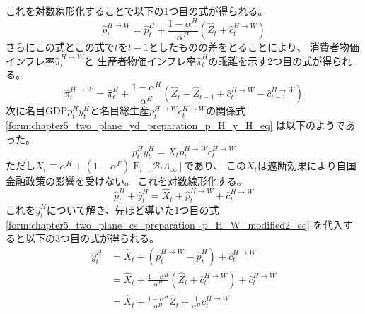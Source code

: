 これを対数線形化することで以下の1つ目の式が得られる。
\begin{equation}
\label{form:chapter5_two_plane_cs_preparation_p_H_W_modified2_eq}
    \hat{p}_t^{H\to W}=\hat{p}_t^H+\frac{1-\alpha^H}{\alpha^H}(\hat{Z}_t+\hat{c}_t^{H\to W})
\end{equation}
さらにこの式とこの式で\(t\)を\(t-1\)としたものの差をとることにより、
消費者物価インフレ率\(\hat{\pi}_t^{H\to W}\)と
生産者物価インフレ率\(\hat{\pi}_t^H\)の乖離を示す2つ目の式が得られる。
\begin{equation}
\label{form:chapter5_two_plane_cs_preparation_pi_H_W_eq}
    \hat{\pi}_t^{H\to W}=\hat{\pi}_t^H+\frac{1-\alpha^H}{\alpha^H}(\hat{Z}_t-\hat{Z}_{t-1}+\hat{c}_t^{H\to W}-\hat{c}_{t-1}^{H\to W})
\end{equation}
次に名目GDP\(p_t^Hy_t^H\)と名目総生産\(p_t^{H\to W}c_t^{H\to W}\)の関係式
\eqref{form:chapter5_two_plane_yd_preparation_p_H_y_H_eq}
は以下のようであった。
\begin{equation}
\label{form:chapter5_two_plane_cs_preparation_p_H_y_H_eq}
    p_t^Hy_t^H=X_tp_t^{H\to W}c_t^{H\to W}
\end{equation}
ただし\(X_t\equiv\alpha^H+(1-\alpha^F)\operatorname{E}_t[\mathcal{B}_t\Lambda_{\infty}]\)であり、
この\(X_t\)は遮断効果により自国金融政策の影響を受けない。
これを対数線形化する。
\begin{equation}
\label{form:chapter5_two_plane_cs_preparation_p_H_y_H_modified_eq}
    \hat{p}_t^H+\hat{y}_t^H=\hat{X}_t+\hat{p}_t^{H\to W}+\hat{c}_t^{H\to W}
\end{equation}
これを\(\hat{y}_t^H\)について解き、先ほど導いた1つ目の式
\eqref{form:chapter5_two_plane_cs_preparation_p_H_W_modified2_eq}
を代入すると以下の3つ目の式が得られる。
\begin{equation}
\label{form:chapter5_two_plane_cs_preparation_p_H_y_H_modified2_eq}
\begin{aligned}
    \hat{y}_t^H
    &=\hat{X}_t+(\hat{p}_t^{H\to W}-\hat{p}_t^H)+\hat{c}_t^{H\to W} \\
    &=\hat{X}_t+\frac{1-\alpha^H}{\alpha^H}(\hat{Z}_t+\hat{c}_t^{H\to W})+\hat{c}_t^{H\to W} \\
    &=\hat{X}_t+\frac{1-\alpha^H}{\alpha^H}\hat{Z}_t+\frac{1}{\alpha^H}\hat{c}_t^{H\to W}
\end{aligned}
\end{equation}

